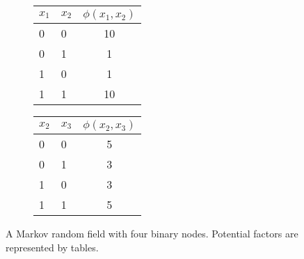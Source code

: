 \begin{figure}[!t]
  \begin{subfigure}{.28\textwidth}
  \end{subfigure}
  \begin{subfigure}{0.3\textwidth}
    \begin{tabular}{llc}
      \toprule
      $x_1$ & $x_2$ & $\phi(x_1, x_2)$ \\ %
      \midrule
      0  &  0  &  10 \\
      0  &  1  &  1 \\
      1  &  0  &  1 \\
      1  &  1  &  10\\
      \bottomrule
    \end{tabular}
  \end{subfigure}
  \begin{subfigure}{0.3\textwidth}
    \begin{tabular}{llc}
      \toprule
      $x_2$ & $x_3$ & $\phi(x_2, x_3)$ \\
      \midrule
      0  &  0  &  5 \\
      0  &  1  &  3 \\
      1  &  0  &  3 \\
      1  &  1  &  5 \\
      \bottomrule
    \end{tabular}
  \end{subfigure}
  \begin{subfigure}{0.03\textwidth}
    \centering
  \end{subfigure}
  \caption{A Markov random field with four binary nodes. Potential factors are represented by tables.}
  \label{chp2:fig:toy_mrf}
  \hspace{1cm}
\end{figure}

